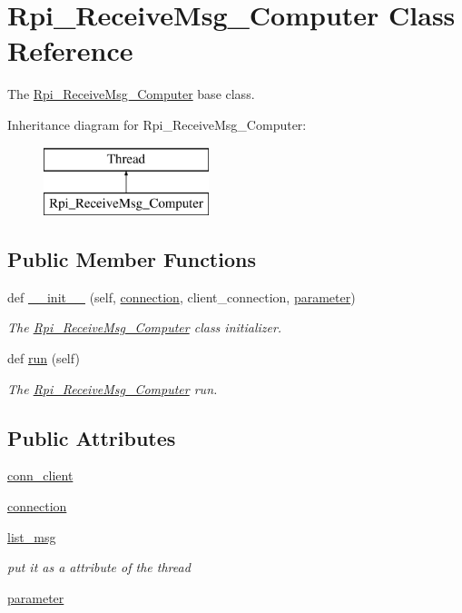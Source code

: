\hypertarget{a00041}{}\section{Rpi\+\_\+\+Receive\+Msg\+\_\+\+Computer Class Reference}
\label{a00041}


The \hyperlink{a00041}{Rpi\+\_\+\+Receive\+Msg\+\_\+\+Computer} base class.  


Inheritance diagram for Rpi\+\_\+\+Receive\+Msg\+\_\+\+Computer\+:\begin{figure}[H]
\begin{center}
\leavevmode
\includegraphics[height=2.000000cm]{a00041}
\end{center}
\end{figure}
\subsection*{Public Member Functions}
\begin{DoxyCompactItemize}
\item 
def \hyperlink{a00041_ae168de759b924eaf8c628e5b550bf9d6}{\+\_\+\+\_\+init\+\_\+\+\_\+} (self, \hyperlink{a00041_a10275a078bd1abcbebc206cc5d19e18b}{connection}, client\+\_\+connection, \hyperlink{a00041_a0d71b5c1dcca8d3fee88d6a11d3e2071}{parameter})
\begin{DoxyCompactList}\small\item\em The \hyperlink{a00041}{Rpi\+\_\+\+Receive\+Msg\+\_\+\+Computer} class initializer. \end{DoxyCompactList}\item 
def \hyperlink{a00041_ad22709b2e67308af35f55680d5a026e0}{run} (self)
\begin{DoxyCompactList}\small\item\em The \hyperlink{a00041}{Rpi\+\_\+\+Receive\+Msg\+\_\+\+Computer} run. \end{DoxyCompactList}\end{DoxyCompactItemize}
\subsection*{Public Attributes}
\begin{DoxyCompactItemize}
\item 
\hyperlink{a00041_a72425342c280a92ddf9d5f113cf11b9f}{conn\+\_\+client}
\item 
\hyperlink{a00041_a10275a078bd1abcbebc206cc5d19e18b}{connection}
\item 
\hyperlink{a00041_adf3bb5e317942dfceab6e24a8ccb0c84}{list\+\_\+msg}
\begin{DoxyCompactList}\small\item\em put it as a attribute of the thread \end{DoxyCompactList}\item 
\hyperlink{a00041_a0d71b5c1dcca8d3fee88d6a11d3e2071}{parameter}
\end{DoxyCompactItemize}



